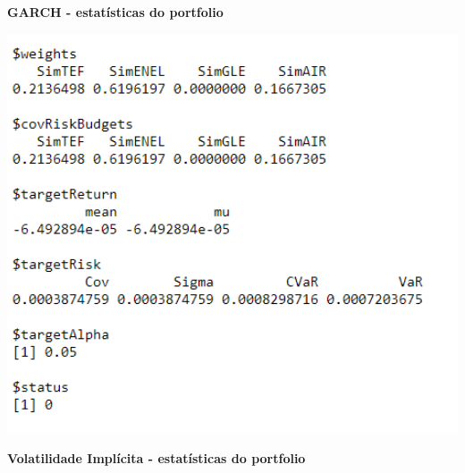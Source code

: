 \documentclass[
  12pt,
  a4paper,
  openany]{book}
\begin{document}
\newpage

\begin{center}
 {\normalfont\Large\bfseries GARCH - estatísticas do portfolio}
\end{center}

\begin{center}
\begin{minipage}{0.90\linewidth}
    \centering
    \includegraphics[width=2\textwidth]{image/garchport.png}
\end{minipage}
\end{center}

\newpage

\begin{center}
 {\normalfont\Large\bfseries Volatilidade Implícita -  estatísticas do portfolio}
\end{center}
\end{document}
